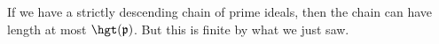If we have a strictly descending chain of prime ideals, then
the chain can have length at most $\hgt(\mathfrak{p})$. But this is finite
by what we just saw.
